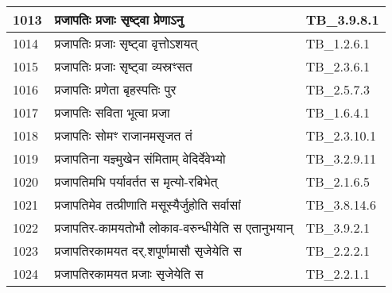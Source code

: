 \documentclass[17pt]{extarticle}
\begin{document}
\begin{longtable}{||p{0.4in}||p{4.9in}||p{0.9in}||}
    \hline
        
    1013 & प्रजापतिः प्रजाः सृष्ट्वा प्रेणाऽनु & TB\_3.9.8.1       \\
    
    \hline
        
    1014 & प्रजापतिः प्रजाः सृष्ट्वा वृत्तोऽशयत् & TB\_1.2.6.1       \\
    
    \hline
        
    1015 & प्रजापतिः प्रजाः सृष्ट्वा व्यस्रꣳसत & TB\_2.3.6.1       \\
    
    \hline
        
    1016 & प्रजापतिः प्रणेता बृहस्पतिः पुर & TB\_2.5.7.3       \\
    
    \hline
        
    1017 & प्रजापतिः सविता भूत्वा प्रजा & TB\_1.6.4.1       \\
    
    \hline
        
    1018 & प्रजापतिः सोमꣳ राजानमसृजत तं & TB\_2.3.10.1       \\
    
    \hline
        
    1019 & प्रजापतिना यज्ञ्मुखेन संमिताम् वेदिर्देवेभ्यो & TB\_3.2.9.11       \\
    
    \hline
        
    1020 & प्रजापतिमभि पर्यावर्तत स मृत्यो{-}रबिभेत् & TB\_2.1.6.5       \\
    
    \hline
        
    1021 & प्रजापतिमेव तत्प्रीणाति मसूस्यैर्जुहोति सर्वासां & TB\_3.8.14.6       \\
    
    \hline
        
    1022 & प्रजापतिर{-}कामयतोभौ लोकाव{-}वरुन्धीयेति स एतानुभयान् & TB\_3.9.2.1       \\
    
    \hline
        
    1023 & प्रजापतिरकामयत दर्.शपूर्णमासौ सृजेयेति स & TB\_2.2.2.1       \\
    
    \hline
        
    1024 & प्रजापतिरकामयत प्रजाः सृजेयेति स & TB\_2.2.1.1       \\
    

\end{longtable}
\end{document}
